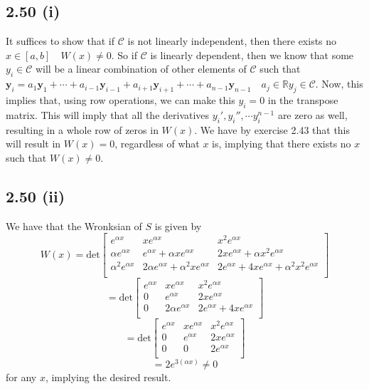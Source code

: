 \documentclass[letterpaper,12pt]{article}
\theoremstyle{definition}
\begin{document}
\subsection*{2.50 (i)}
It suffices to show that if $\mathscr{C} $ is not linearly independent, then there exists no $x \in [a,b] \quad W(x) \neq 0$. So if $\mathscr{C}$ is linearly dependent, then we know that some $y_i \in \mathscr{C} $ will be a linear combination of other elements of $\mathscr{C}$ such that $\mathbf{y}_i = a_1 \mathbf{y}_1 +\cdots + a_{i-1} \mathbf{y}_{i-1} +a_{i+1} \mathbf{y}_{i+1} +\cdots+ a_{n-1} \mathbf{y}_{n-1} \quad a_j \in \mathbb{R} y_j \in \mathscr{C}$. Now, this implies that, using row operations, we can make this $y_i = 0$ in the transpose matrix. This will imply that all the derivatives $y_i', y_i'',\cdots y_i^{n-1}$ are zero as well, resulting in a whole row of zeros in $W(x)$. We have by exercise 2.43 that this will result in $W(x) = 0$, regardless of what $x$ is, implying that there exists no $x$ such that $W(x) \neq 0$.

\subsection*{2.50 (ii)}
We have that the Wronksian of $S$ is given by
\[
W(x) = \text{det} 
\begin{bmatrix}
    e^{\alpha x} & x e^{\alpha x} & x^2 e^{\alpha x} \\
    \alpha e^{\alpha x} & e^{\alpha x} + \alpha x e^{\alpha x} & 2xe^{\alpha x} + \alpha x^2 e^{\alpha x} \\
    \alpha^2 e^{\alpha x} & 2 \alpha e^{\alpha x} + \alpha^2 x e^{\alpha x} & 2e^{\alpha x} + 4xe^{\alpha x} + \alpha^2 x^2 e^{\alpha x} \\
\end{bmatrix}
\]
\[
= \text{det} 
\begin{bmatrix}
    e^{\alpha x} & x e^{\alpha x} & x^2 e^{\alpha x} \\
    0 & e^{\alpha x} & 2xe^{\alpha x} \\
    0 & 2 \alpha e^{\alpha x} & 2e^{\alpha x} + 4xe^{\alpha x} \\
\end{bmatrix}
\]
\[
= \text{det} 
\begin{bmatrix}
    e^{\alpha x} & x e^{\alpha x} & x^2 e^{\alpha x} \\
    0 & e^{\alpha x} & 2xe^{\alpha x} \\
    0 & 0 & 2e^{\alpha x} \\
\end{bmatrix}
\]
\[
=2e^{3(\alpha x)} \neq 0
\]
for any $x$, implying the desired result.
\end{document}
